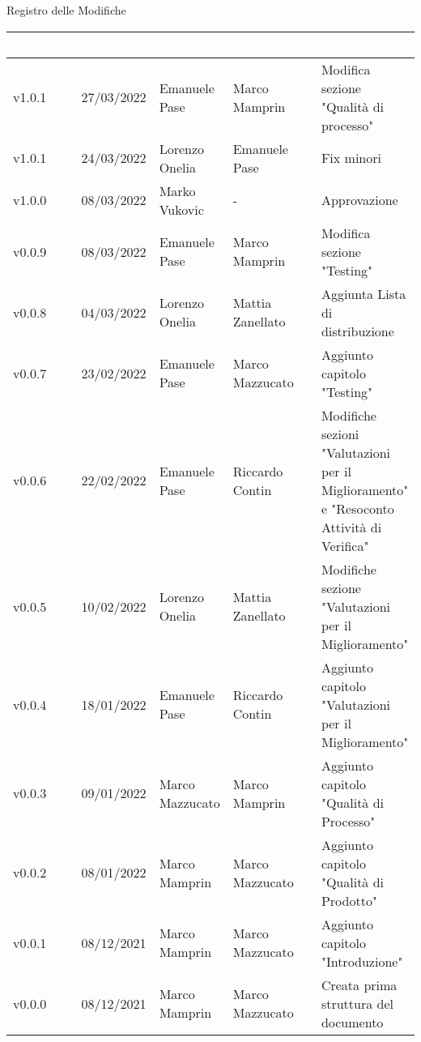 \begin{center}
  \huge{Registro delle Modifiche}
\end{center}
\renewcommand\arraystretch{1,5}
{\centering
\begin{longtable}{|C{1.8cm}|C{2.1cm}|C{2cm}|C{2.4cm}|L{4.4cm}|}
  \hline
  \textcolor[HTML]{FFFFFF}{\textbf{Versione}} & \textcolor[HTML]{FFFFFF}{\textbf{Data}} & \textcolor[HTML]{FFFFFF}{\textbf{Autore}}  & \textcolor[HTML]{FFFFFF}{\textbf{Verificatore}} & \textcolor[HTML]{FFFFFF}{\textbf{Modifica}}    \\ \hline
  v1.0.1       & 27/03/2022    & Emanuele Pase  & Marco Mamprin      & Modifica sezione "Qualità di processo"                   \\ \hline
  v1.0.1        & 24/03/2022    & Lorenzo Onelia  & Emanuele Pase    & Fix minori                  \\ \hline
  v1.0.0       & 08/03/2022   & Marko Vukovic & - & Approvazione     \\ \hline
  v0.0.9       & 08/03/2022    & Emanuele Pase  & Marco Mamprin         & Modifica sezione "Testing"                   \\ \hline
  v0.0.8       & 04/03/2022    & Lorenzo Onelia  & Mattia Zanellato     & Aggiunta Lista di distribuzione                  \\ \hline
  v0.0.7        & 23/02/2022    & Emanuele Pase    & Marco Mazzucato   & Aggiunto capitolo "Testing"                           \\ \hline
  v0.0.6        & 22/02/2022    & Emanuele Pase     & Riccardo Contin    & Modifiche sezioni "Valutazioni per il Miglioramento" e "Resoconto Attività di Verifica" \\ \hline
  v0.0.5        & 10/02/2022    & Lorenzo Onelia    & Mattia Zanellato   & Modifiche sezione "Valutazioni per il Miglioramento"            \\ \hline
  v0.0.4        & 18/01/2022    & Emanuele Pase     & Riccardo Contin    & Aggiunto capitolo "Valutazioni per il Miglioramento"           \\ \hline
  v0.0.3        & 09/01/2022    & Marco Mazzucato   & Marco Mamprin      & Aggiunto capitolo "Qualità di Processo"                        \\ \hline
  v0.0.2        & 08/01/2022    & Marco Mamprin     & Marco Mazzucato    & Aggiunto capitolo "Qualità di Prodotto"                        \\ \hline
  v0.0.1        & 08/12/2021    & Marco Mamprin     & Marco Mazzucato    & Aggiunto capitolo "Introduzione"                               \\ \hline
  v0.0.0        & 08/12/2021    & Marco Mamprin     & Marco Mazzucato    & Creata prima struttura del documento                           \\ \hline
\end{longtable}}

\renewcommand\arraystretch{1}
